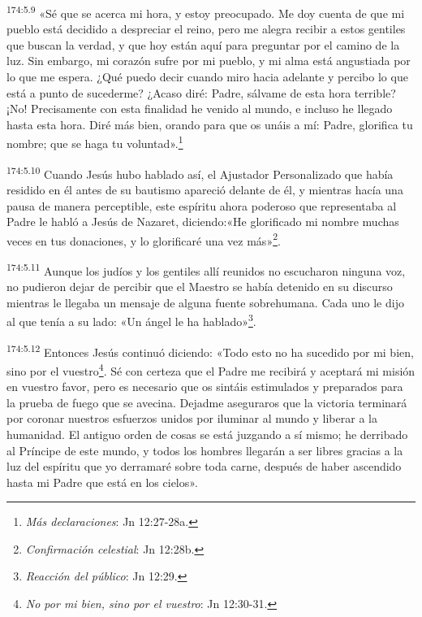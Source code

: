 \par
\textsuperscript{174:5.9} «Sé que se acerca mi hora, y estoy preocupado. Me doy cuenta de que mi pueblo está decidido a despreciar el reino, pero me alegra recibir a estos gentiles que buscan la verdad, y que hoy están aquí para preguntar por el camino de la luz. Sin embargo, mi corazón sufre por mi pueblo, y mi alma está angustiada por lo que me espera. ¿Qué puedo decir cuando miro hacia adelante y percibo lo que está a punto de sucederme? ¿Acaso diré: Padre, sálvame de esta hora terrible? ¡No! Precisamente con esta finalidad he venido al mundo, e incluso he llegado hasta esta hora. Diré más bien, orando para que os unáis a mí: Padre, glorifica tu nombre; que se haga tu voluntad».\footnote{\textit{Más declaraciones}: Jn 12:27-28a.}

\par
\textsuperscript{174:5.10} Cuando Jesús hubo hablado así, el Ajustador Personalizado que había residido en él antes de su bautismo apareció delante de él, y mientras hacía una pausa de manera perceptible, este espíritu ahora poderoso que representaba al Padre le habló a Jesús de Nazaret, diciendo:«He glorificado mi nombre muchas veces en tus donaciones, y lo glorificaré una vez más»\footnote{\textit{Confirmación celestial}: Jn 12:28b.}.

\par
\textsuperscript{174:5.11} Aunque los judíos y los gentiles allí reunidos no escucharon ninguna voz, no pudieron dejar de percibir que el Maestro se había detenido en su discurso mientras le llegaba un mensaje de alguna fuente sobrehumana. Cada uno le dijo al que tenía a su lado: «Un ángel le ha hablado»\footnote{\textit{Reacción del público}: Jn 12:29.}.

\par
\textsuperscript{174:5.12} Entonces Jesús continuó diciendo: «Todo esto no ha sucedido por mi bien, sino por el vuestro\footnote{\textit{No por mi bien, sino por el vuestro}: Jn 12:30-31.}. Sé con certeza que el Padre me recibirá y aceptará mi misión en vuestro favor, pero es necesario que os sintáis estimulados y preparados para la prueba de fuego que se avecina. Dejadme aseguraros que la victoria terminará por coronar nuestros esfuerzos unidos por iluminar al mundo y liberar a la humanidad. El antiguo orden de cosas se está juzgando a sí mismo; he derribado al Príncipe de este mundo, y todos los hombres llegarán a ser libres gracias a la luz del espíritu que yo derramaré sobre toda carne, después de haber ascendido hasta mi Padre que está en los cielos».

